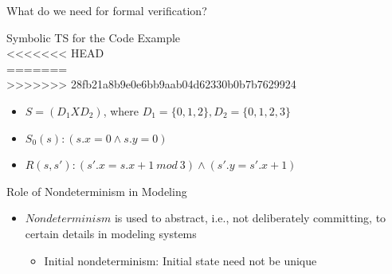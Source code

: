 \documentclass{beamer}
\begin{document}
\begin{frame}{What do we need for formal verification?}
\begin{frame}{Symbolic TS for the Code Example}
\hfill
{} \\
<<<<<<< HEAD
 \\
=======
 \\
>>>>>>> 28fb21a8b9e0e6bb9aab04d62330b0b7b7629924
\begin{itemize}
\item<3-> $S = (D_1 X D_2)$, where $D_1 = \{0,1,2\}, D_2 = \{0,1,2,3\}$
\item<3-> $S_0(s): (s.x = 0 \land s.y =0)$
\item<3-> $R(s,s'): (s'.x = s.x+1~mod~3) \land (s'.y = s'.x + 1) $
\end{itemize}
\end{frame}

\begin{frame}{Role of Nondeterminism in Modeling}
\begin{itemize}
\item<1-> $Nondeterminism$ is used to abstract, i.e., not deliberately committing, to certain details in modeling systems
\begin{itemize}
\item<2-> Initial nondeterminism: Initial state need not be unique


\end{itemize}
\end{itemize}
\end{frame}
\end{frame}
\end{document}

